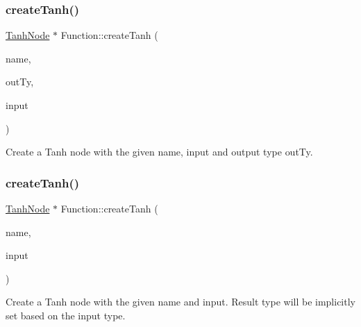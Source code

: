 \subsubsection{\texorpdfstring{create\+Tanh()}{createTanh()}\hspace{0.1cm}{\footnotesize\ttfamily [1/2]}}
{\footnotesize\ttfamily \hyperlink{classglow_1_1_tanh_node}{Tanh\+Node} $\ast$ Function\+::create\+Tanh (\begin{DoxyParamCaption}\item[{llvm\+::\+String\+Ref}]{name,  }\item[{\hyperlink{structglow_1_1_type}{Type\+Ref}}]{out\+Ty,  }\item[{\hyperlink{structglow_1_1_node_value}{Node\+Value}}]{input }\end{DoxyParamCaption})}

Create a Tanh node with the given {\ttfamily name}, {\ttfamily input} and output type {\ttfamily out\+Ty}. \mbox{\label{classglow_1_1_function_a311e1981e013129cef4882a2598c36f4}} 
\subsubsection{\texorpdfstring{create\+Tanh()}{createTanh()}\hspace{0.1cm}{\footnotesize\ttfamily [2/2]}}
{\footnotesize\ttfamily \hyperlink{classglow_1_1_tanh_node}{Tanh\+Node} $\ast$ Function\+::create\+Tanh (\begin{DoxyParamCaption}\item[{llvm\+::\+String\+Ref}]{name,  }\item[{\hyperlink{structglow_1_1_node_value}{Node\+Value}}]{input }\end{DoxyParamCaption})}

Create a Tanh node with the given {\ttfamily name} and {\ttfamily input}. Result type will be implicitly set based on the {\ttfamily input} type. \mbox{\label{classglow_1_1_function_aea101a646a4e71c0b513608587127217}} 
